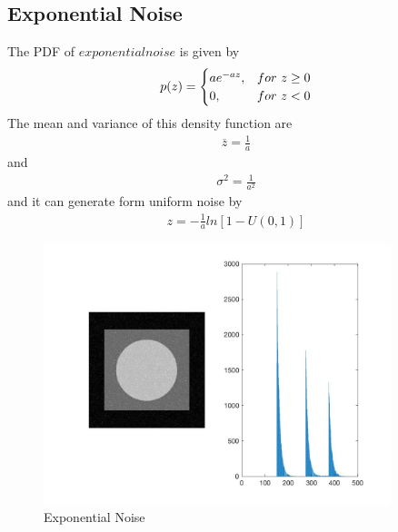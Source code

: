 \documentclass[11pt,oneside]{book}
\begin{document}
\subsection{Exponential Noise}
The PDF of $exponential noise$ is given by\\
\begin{eqnarray}p(z)=
\begin{cases}
ae^{-az}, &for\ z \ge 0\cr 0, &for\ z <0\end{cases}
\end{eqnarray}
The mean and variance of this density function are\\
\begin{align}
\overline z = \frac{1}{a}
\end{align}
and\\
\begin{align}
\sigma ^2 = \frac{1}{a^2}
\end{align}
and it can generate form uniform noise by\\
\begin{align}
z = -\frac{1}{a}ln[1-U(0,1)]
\end{align}
\begin{figure}[!htb]
   \centering  
   \includegraphics[width=0.9\textwidth]{images/4/exponential.jpg}
   \caption{Exponential Noise}
\end{figure}
\newpage
\end{document}

